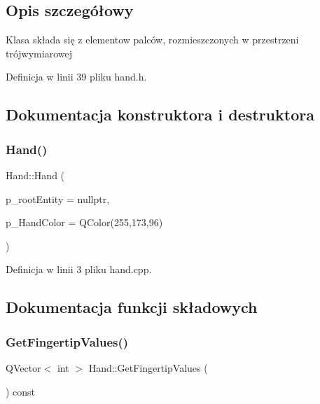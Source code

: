 \subsection{Opis szczegółowy}
Klasa składa się z elementow palców, rozmieszczonych w przestrzeni trójwymiarowej 

Definicja w linii 39 pliku hand.\+h.



\subsection{Dokumentacja konstruktora i destruktora}
\mbox{\label{class_hand_a4a21ef8143e36ab41a5afbd7b292b14c}} 
\subsubsection{\texorpdfstring{Hand()}{Hand()}}
{\footnotesize\ttfamily Hand\+::\+Hand (\begin{DoxyParamCaption}\item[{Qt3\+D\+Core\+::\+Q\+Entity $\ast$}]{p\+\_\+root\+Entity = {\ttfamily nullptr},  }\item[{Q\+Color}]{p\+\_\+\+Hand\+Color = {\ttfamily QColor(255,173,96)} }\end{DoxyParamCaption})}



Definicja w linii 3 pliku hand.\+cpp.



\subsection{Dokumentacja funkcji składowych}
\mbox{\label{class_hand_ab886f121780eb05a17fdbabd04442d78}} 
\subsubsection{\texorpdfstring{Get\+Fingertip\+Values()}{GetFingertipValues()}}
{\footnotesize\ttfamily Q\+Vector$<$ int $>$ Hand\+::\+Get\+Fingertip\+Values (\begin{DoxyParamCaption}{ }\end{DoxyParamCaption}) const}



